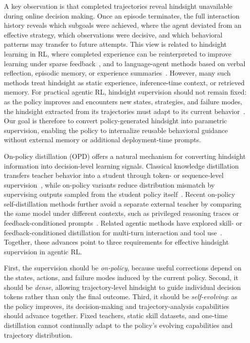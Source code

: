 A key observation is that completed trajectories reveal hindsight unavailable during online decision making. Once an episode terminates, the full interaction history reveals which subgoals were achieved, where the agent deviated from an effective strategy, which observations were decisive, and which behavioral patterns may transfer to future attempts. This view is related to hindsight learning in RL, where completed experience can be reinterpreted to improve learning under sparse feedback~\citep{andrychowicz2017hindsight}, and to language-agent methods based on verbal reflection, episodic memory, or experience summaries~\citep{shinn2023reflexion,zhao2024expel,wang2023voyager,madaan2023selfrefine}. However, many such methods treat hindsight as static experience, inference-time context, or retrieved memory. For practical agentic RL, hindsight supervision should not remain fixed: as the policy improves and encounters new states, strategies, and failure modes, the hindsight extracted from its trajectories must adapt to its current behavior~\citep{andrychowicz2017hindsight,zhang2026the}. Our goal is therefore to convert policy-generated hindsight into parametric supervision, enabling the policy to internalize reusable behavioral guidance without external memory or additional deployment-time prompts.

On-policy distillation (OPD) offers a natural mechanism for converting hindsight information into decision-level learning signals. Classical knowledge distillation transfers teacher behavior into a student through token- or sequence-level supervision~\citep{hinton2015distilling,kim2016sequence}, while on-policy variants reduce distribution mismatch by supervising outputs sampled from the student policy itself~\citep{ross2011reduction,agarwal2024onpolicy}. Recent on-policy self-distillation methods further avoid a separate external teacher by comparing the same model under different contexts, such as privileged reasoning traces or feedback-conditioned prompts~\citep{zhao2026selfdistilledreasoner,hubotter2026sdpo}. Related agentic methods have explored skill- or feedback-conditioned distillation for multi-turn interaction and tool use~\citep{wang2026skillsd,lu2026sdar,zhong2026sod,ko2026reopold,yang2026opid}. Together, these advances point to three requirements for effective hindsight supervision in agentic RL.

First, the supervision should be \emph{on-policy}, because useful corrections depend on the states, actions, and failure modes induced by the current policy. Second, it should be \emph{dense}, allowing trajectory-level hindsight to guide individual decision tokens rather than only the final outcome. Third, it should be \emph{self-evolving}: as the policy improves, its decision-making and trajectory-analysis capabilities should advance together. Fixed teachers, static skill datasets, and one-time distillation cannot continually adapt to the policy's evolving capabilities and trajectory distribution.


